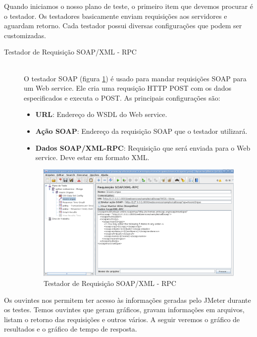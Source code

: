 Quando iniciamos o nosso plano de teste, o primeiro item que devemos procurar é o testador. Os testadores basicamente enviam requisições aos servidores e aguardam retorno. Cada testador possui diversas configurações que podem ser customizadas.

\begin{description}
\item[ Testador de Requisição SOAP/XML - RPC] \hfill \\

O testador SOAP (figura \ref{fig:testador_insere_orgao}) é usado para mandar requisições SOAP para um Web service.  Ele cria uma requsição HTTP POST com os dados especificados e executa o POST.  As principais configurações são:


\begin{itemize}
\item \textbf{URL}:  Endereço do WSDL do Web service.
\item \textbf{Ação SOAP}: Endereço da requisição SOAP que o testador utilizará.
\item \textbf{Dados SOAP/XML-RPC}: Requisição que será enviada para o Web service. Deve estar em formato XML.
\end{itemize}

	\begin{figure}[!htbp]
		\begin{center}
			\includegraphics[width=1\textwidth]{testador_insere_orgao}
		\end{center}
		\caption{Testador de Requisição SOAP/XML - RPC}
		\label{fig:testador_insere_orgao}
	\end{figure}
	
\end{description}

Os ouvintes nos permitem ter acesso às informações geradas pelo JMeter durante os testes. Temos ouvintes que geram gráficos, gravam informações em arquivos, listam o retorno das requisições e outros vários. A seguir veremos o gráfico de resultados e o gráfico de tempo de resposta.

